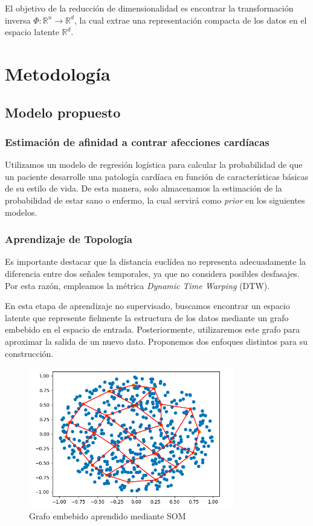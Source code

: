 \documentclass[titlepage,a4paper]{article}
\begin{document}
El objetivo de la reducción de dimensionalidad es encontrar la transformación inversa \( \Phi: \mathbb{R}^n \to \mathbb{R}^d \), la cual extrae una representación compacta de los datos en el espacio latente \( \mathbb{R}^d \).


\section{Metodología}
\subsection{Modelo propuesto}
\subsubsection{Estimación de afinidad a contrar afecciones cardíacas}
Utilizamos un modelo de regresión logística para calcular la probabilidad de que un paciente desarrolle una patología cardíaca en función de características básicas de su estilo de vida. De esta manera, solo almacenamos la estimación de la probabilidad de estar sano o enfermo, la cual servirá como \textit{prior} en los siguientes modelos.

\subsubsection{Aprendizaje de Topología}
Es importante destacar que la distancia euclídea no representa adecuadamente la diferencia entre dos señales temporales, ya que no considera posibles desfasajes. Por esta razón, empleamos la métrica \textit{Dynamic Time Warping} (DTW).

En esta etapa de aprendizaje no supervisado, buscamos encontrar un espacio latente que represente fielmente la estructura de los datos mediante un grafo embebido en el espacio de entrada. Posteriormente, utilizaremos este grafo para aproximar la salida de un nuevo dato. Proponemos dos enfoques distintos para su construcción.

\begin{figure}[H]
    \centering
    \includegraphics[width=0.8\textwidth]{uniforme_circulo.png}
    \caption{Grafo embebido aprendido mediante SOM}
    \label{fig:mi_figura}
\end{figure}
\end{document}
